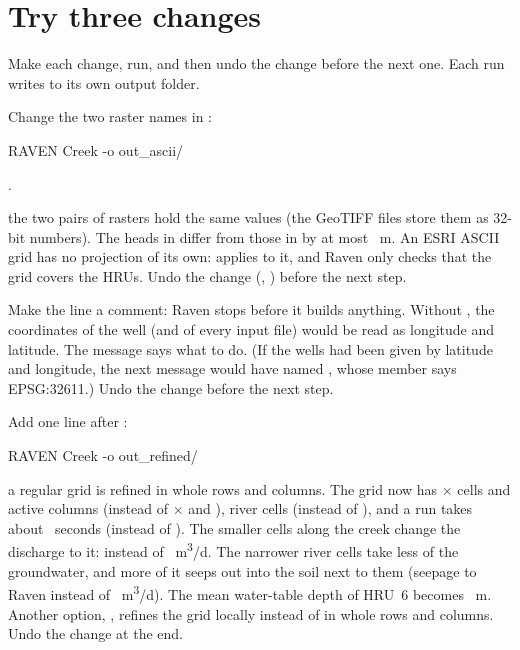 \section{Try three changes}
Make each change, run, and then undo the change before the next one. Each run writes to its own output folder.

Change the two raster names in :
\begin{shell}
$ $RAVEN Creek -o out_ascii/
\end{shell}
\see {}.

\why the two pairs of rasters hold the same values (the GeoTIFF files store them as 32-bit numbers). The heads in
 differ from those in  by at most ~m. An ESRI ASCII grid has no
projection of its own:  applies to it, and Raven only checks that the grid covers the HRUs. Undo the change
(, ) before the next step.

\label{st:nocrs}
Make the  line a comment:
\see Raven stops before it builds anything. Without , the coordinates of the well (and of every input file)
would be read as longitude and latitude. The message says what to do. (If the wells had been given by latitude and
longitude, the next message would have named , whose  member says EPSG:32611.) Undo the change
before the next step.

Add one line after :
\begin{shell}
$ $RAVEN Creek -o out_refined/
\end{shell}
\why a regular grid is refined in whole rows and columns. The grid now has $\times$ cells and
 active columns (instead of $\times$ and ),  river
cells (instead of ), and a run takes about ~seconds (instead of ).
The smaller cells along the creek change the discharge to it:  instead of
~m\textsuperscript{3}/d. The narrower river cells take less of the groundwater, and more of it seeps out into
the soil next to them (seepage to Raven  instead of ~m\textsuperscript{3}/d). The mean
water-table depth of HRU~6 becomes ~m. Another option, , refines the grid locally
instead of in whole rows and columns. Undo the change at the end.
